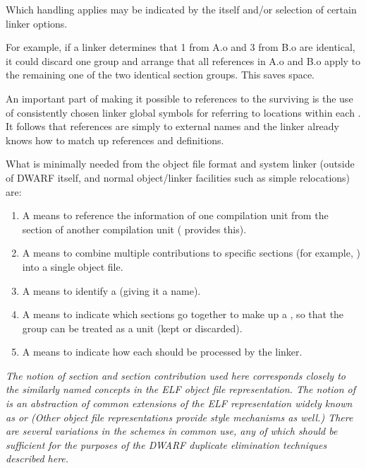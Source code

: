 Which handling applies may be indicated by the 
itself and/or selection of certain linker options.

For example, if a linker determines that 
 1
from A.o and 
 3 from B.o are identical, it could
discard one group and arrange that all references in A.o and
B.o apply to the remaining one of the two identical section
groups. This saves space.

An important part of making it possible to 
references to the surviving 
 is the use of
consistently chosen linker global symbols for referring to
locations within each 
.
It follows that references
are simply to external names and the linker already knows
how to match up references and definitions.

What is minimally needed from the object file format and system
linker (outside of DWARF itself, and normal object/linker
facilities such as simple relocations) are:
\begin{enumerate}[1. ]

\item A means to reference the \dotdebuginfo{} information 
of one compilation unit from the \dotdebuginfo{} section of 
another compilation unit (\DWFORMrefaddr{} provides this).

\item A means to combine multiple contributions to specific sections
(for example, \dotdebuginfo{}) into a single object file.

\item  A means to identify a  
(giving it a name).

\item A means to indicate which sections go together to make
up a , so that the group can be 
treated as a unit (kept or discarded).

\item  A means to indicate how each  
should be processed by the linker.

\end{enumerate}

\textit{The notion of section and section contribution used here
corresponds closely to the similarly named concepts in the
ELF object file representation. 
The notion of  is
an abstraction of common extensions of the ELF representation
widely known as 
 or  (Other
object file representations provide \COMDAT{}\dash style mechanisms as
well.) There are several variations in the \COMDAT{} schemes in
common use, any of which should be sufficient for the purposes
of the 
DWARF duplicate elimination techniques described here.}

